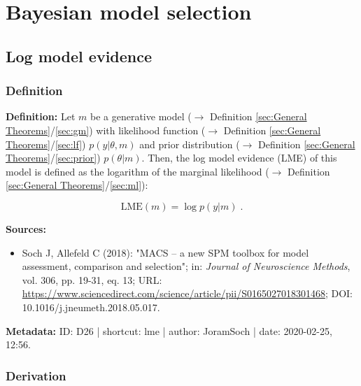 \documentclass[a4paper,12pt,twoside]{book}
\begin{document}
\pagebreak
\section{Bayesian model selection}

\subsection{Log model evidence}

\subsubsection[\textit{Definition}]{Definition} \label{sec:lme}
\setcounter{equation}{0}

\textbf{Definition:} Let $m$ be a generative model ($\rightarrow$ Definition \ref{sec:General Theorems}/\ref{sec:gm}) with likelihood function ($\rightarrow$ Definition \ref{sec:General Theorems}/\ref{sec:lf}) $p(y \vert \theta, m)$ and prior distribution ($\rightarrow$ Definition \ref{sec:General Theorems}/\ref{sec:prior}) $p(\theta \vert m)$. Then, the log model evidence (LME) of this model is defined as the logarithm of the marginal likelihood ($\rightarrow$ Definition \ref{sec:General Theorems}/\ref{sec:ml}):

\begin{equation} \label{eq:lme-LME}
\mathrm{LME}(m) = \log p(y|m) \; .
\end{equation}


\vspace{1em}
\textbf{Sources:}
\begin{itemize}
\item Soch J, Allefeld C (2018): "MACS – a new SPM toolbox for model assessment, comparison and selection"; in: \textit{Journal of Neuroscience Methods}, vol. 306, pp. 19-31, eq. 13; URL: \url{https://www.sciencedirect.com/science/article/pii/S0165027018301468}; DOI: 10.1016/j.jneumeth.2018.05.017.
\end{itemize}


\vspace{1em}
\textbf{Metadata:} ID: D26 | shortcut: lme | author: JoramSoch | date: 2020-02-25, 12:56.
\vspace{1em}



\subsubsection[\textbf{Derivation}]{Derivation} \label{sec:lme-der}
\setcounter{equation}{0}
\end{document}
